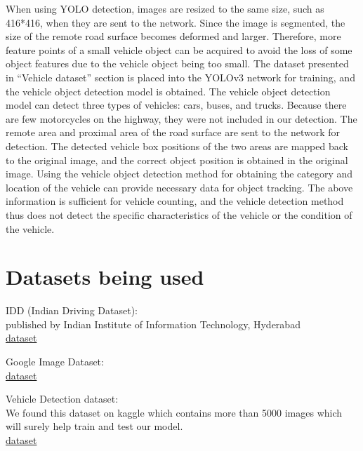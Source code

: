 \documentclass[12pt,a4paper,roman]{article}
\begin{document}
When using YOLO detection, images are resized to the same size, such as 416*416, when they are sent to the network. Since the image is segmented, the size of the remote road surface becomes deformed and larger. Therefore, more feature points of a small vehicle object can be acquired to avoid the loss of some object features due to the vehicle object being too small. The dataset presented in “Vehicle dataset” section is placed into the YOLOv3 network for training, and the vehicle object detection model is obtained. The vehicle object detection model can detect three types of vehicles: cars, buses, and trucks. Because there are few motorcycles on the highway, they were not included in our detection. The remote area and proximal area of the road surface are sent to the network for detection. The detected vehicle box positions of the two areas are mapped back to the original image, and the correct object position is obtained in the original image. Using the vehicle object detection method for obtaining the category and location of the vehicle can provide necessary data for object tracking. The above information is sufficient for vehicle counting, and the vehicle detection method thus does not detect the specific characteristics of the vehicle or the condition of the vehicle.\\
\section{Datasets being used}


{IDD (Indian Driving Dataset): \\ 
published by Indian Institute of Information Technology, Hyderabad \\ 
{\color{blue} \href{ https://idd.insaan.iiit.ac.in/ } {dataset }} 

\vspace{5mm}

    \hspace{-6mm}Google Image Dataset: \\ 
    {\color{blue} \href{ https://storage.googleapis.com/openimages/web/index.html } {dataset}}


\vspace{5mm}
\hspace{-6mm}Vehicle Detection dataset: 
\\
We found this dataset on kaggle which contains more than 5000 images which will surely help train and test our model.  \\ 
{\color{blue} \href{ https://www.kaggle.com/pratikbarua/vehicle-detection-dataset } {dataset \\}} 

}
\end{document}
